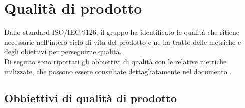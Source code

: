 \section{Qualità di prodotto}

Dallo standard ISO/IEC 9126, il gruppo \Gruppo{} ha identificato le qualità che ritiene necessarie nell'intero ciclo di vita del prodotto e ne ha tratto delle metriche e degli obiettivi per perseguirne qualità.\\
Di seguito sono riportati gli obbiettivi di qualità con le relative metriche utilizzate, che possono essere consultate dettagliatamente nel documento .


\subsection{Obbiettivi di qualità di prodotto}
\renewcommand{\arraystretch}{1.5}
